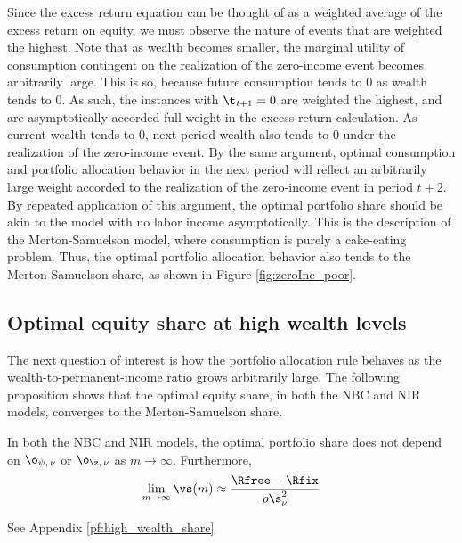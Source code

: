 Since the excess return equation can be thought of as a weighted average of the excess return on equity, we must observe the nature of events that are weighted the highest. Note that as wealth becomes smaller, the marginal utility of consumption contingent on the realization of the zero-income event becomes arbitrarily large. This is so, because future consumption tends to 0 as wealth tends to 0. As such, the instances with $\t_{t+1} = 0$ are weighted the highest, and are asymptotically accorded full weight in the excess return calculation. As current wealth tends to 0, next-period wealth also tends to 0 under the realization of the zero-income event. By the same argument, optimal consumption and portfolio allocation behavior in the next period will reflect an arbitrarily large weight accorded to the realization of the zero-income event in period $t+2$. By repeated application of this argument, the optimal portfolio share should be akin to the model with no labor income asymptotically. This is the description of the Merton-Samuelson model, where consumption is purely a cake-eating problem. Thus, the optimal portfolio allocation behavior also tends to the Merton-Samuelson share, as shown in Figure \ref{fig:zeroInc_poor}.

\subsection{Optimal equity share at high wealth levels}

The next question of interest is how the portfolio allocation rule behaves as the wealth-to-permanent-income ratio grows arbitrarily large. The following proposition shows that the optimal equity share, in both the NBC and NIR models, converges to the Merton-Samuelson share.

\begin{prop}\label{prop:high_wealth_share}
    In both the NBC and NIR models, the optimal portfolio share does not depend on $\o_{\psi,\,\nu}$ or $\o_{\z,\,\nu}$ as $m \to \infty$. Furthermore,
    \[
        \lim_{m\to\infty}\vs(m) \approx \frac{\Rfree - \Rfix}{\rho\s_{\nu}^2}
    \]
\end{prop}

\pf See Appendix \ref{pf:high_wealth_share}

